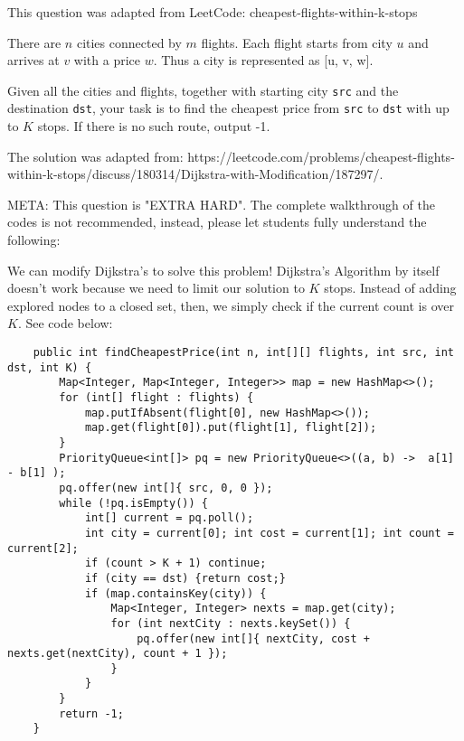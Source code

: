 \question This question was adapted from LeetCode: cheapest-flights-within-k-stops

There are $n$ cities connected by $m$ flights. Each flight starts from city $u$ and arrives at $v$ with a price $w$. Thus a city is represented as [u, v, w].

Given all the cities and flights, together with starting city \texttt{src} and the destination \texttt{dst}, your task is to find the cheapest price from \texttt{src} to \texttt{dst} with up to $K$ stops. If there is no such route, output -1.

\begin{solution}
The solution was adapted from: https://leetcode.com/problems/cheapest-flights-within-k-stops/discuss/180314/Dijkstra-with-Modification/187297/.

META: This question is "EXTRA HARD". The complete walkthrough of the codes is not recommended, instead, please let students fully understand the following:

We can modify Dijkstra's to solve this problem! Dijkstra's Algorithm by itself doesn't work because we need to limit our solution to $K$ stops. Instead of adding explored nodes to a closed set, then, we simply check if the current count is over $K$. See code below:
\begin{lstlisting}
    public int findCheapestPrice(int n, int[][] flights, int src, int dst, int K) {
        Map<Integer, Map<Integer, Integer>> map = new HashMap<>();
        for (int[] flight : flights) {
            map.putIfAbsent(flight[0], new HashMap<>());
            map.get(flight[0]).put(flight[1], flight[2]);
        }
        PriorityQueue<int[]> pq = new PriorityQueue<>((a, b) ->  a[1] - b[1] );
        pq.offer(new int[]{ src, 0, 0 });
        while (!pq.isEmpty()) {
            int[] current = pq.poll();
            int city = current[0]; int cost = current[1]; int count = current[2];
            if (count > K + 1) continue;
            if (city == dst) {return cost;}
            if (map.containsKey(city)) {
                Map<Integer, Integer> nexts = map.get(city);
                for (int nextCity : nexts.keySet()) {
                    pq.offer(new int[]{ nextCity, cost + nexts.get(nextCity), count + 1 });
                }
            }
        }
        return -1;     
    }
\end{lstlisting}
\end{solution}

